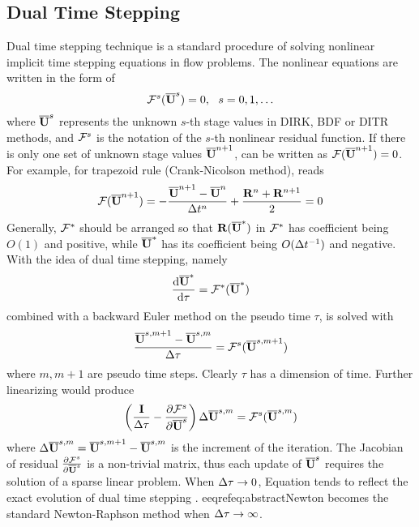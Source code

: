 \subsection{Dual Time Stepping}
\label{ssec:dualTime}

Dual time stepping technique \cite{jameson1991time,jameson2017evaluation}
is a standard procedure of solving nonlinear
implicit time stepping equations
in flow problems.
The nonlinear equations are written in the form of
\begin{equation}
    \FF^s(\uu^s) = 0,\ \ s=0,1,\dots
    \label{eq:abstractImplicit}
\end{equation}
where $\overline{\mathbf{U}}^s$ represents the unknown $s$-th stage values
in DIRK, BDF or DITR methods, 
and $\mathcal{F}^s$ is the notation of the $s$-th nonlinear residual function.
If there is only one set of unknown stage values $\overline{\mathbf{U}}^{n+1}$, 
 can be written as 
$\mathcal{F}(\overline{\mathbf{U}}^{n+1})=0$.
For example, for trapezoid rule (Crank-Nicolson method),
 reads
\begin{equation}
    \label{eq:trapF}
    \mathcal{F}(\overline{\mathbf{U}}^{n+1}) =
    -\frac{\overline{\mathbf{U}}^{n+1}-\overline{\mathbf{U}}^{n}}{{\Delta} t^n} + \frac{\mathbf{R}^{n} + \mathbf{R}^{n+1}}{2}
    =0
\end{equation}
Generally, $\mathcal{F}^*$ should be arranged so that
$\mathbf{R}(\overline{\mathbf{U}}^*)$ in $\mathcal{F}^*$ has coefficient being $O(1)$ and positive,
while $\overline{\mathbf{U}}^*$ has its coefficient being $O({\Delta} t^{-1})$ and negative.
With the idea of dual time stepping, namely
\begin{equation}
    \frac{\dd\overline{\mathbf{U}}^{*}}{\dd \tau} = \mathcal{F}^*(\overline{\mathbf{U}}^{*})
    \label{eq:exactDualTime}
\end{equation}
combined with a backward Euler method on the
pseudo time $\tau$, 
is solved with
\begin{equation}
    \frac{\overline{\mathbf{U}}^{s,m+1} - \overline{\mathbf{U}}^{s,m}}{{\Delta} \tau} = \mathcal{F}^s(\overline{\mathbf{U}}^{s,m+1})
\end{equation}
where $m, m+1$ are pseudo time steps.
Clearly $\tau$ has a dimension of time.
Further linearizing would produce
\begin{equation}
    \left(\frac{\eye}{\inc\tau} -
    \partialderivative{\FF^s}{\uu^s}  \right)
    \inc\uu^{s,m} = \FF^s(\uu^{s,m})
    \label{eq:abstractNewton}
\end{equation}
where ${\Delta}\overline{\mathbf{U}}^{s,m} = \overline{\mathbf{U}}^{s,m+1} - \overline{\mathbf{U}}^{s,m}$ is the increment
of the iteration.
The Jacobian of residual $\partialderivative{\FF^s}{\uu^s}$
is a non-trivial matrix, thus each update of $\overline{\mathbf{U}}^s$ requires
the solution of a sparse linear problem.
When ${\Delta}\tau\rightarrow0$, Equation 
tends to reflect the exact evolution of dual time stepping
.
eeqref{eq:abstractNewton} becomes the
standard Newton-Raphson method when ${\Delta}\tau\rightarrow\infty$.

